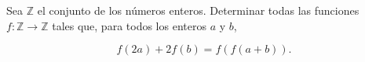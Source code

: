 Sea $\mathbb{Z}$ el conjunto de los números enteros. Determinar todas las funciones $f : \mathbb{Z} \to \mathbb{Z}$ tales que, para todos los enteros $a$ y $b$,

\[f(2a)+2f(b)=f(f(a+b)).\]
